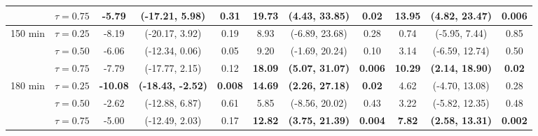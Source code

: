 \begin{table}[ht]
{\begin{tabular}{llccccccccc}
 & $\tau=0.75$ & -5.79 & (-17.21, 5.98) & 0.31 & \textbf{19.73} & \textbf{(4.43, 33.85)} & \textbf{0.02} & \textbf{13.95} & \textbf{(4.82, 23.47)} & \textbf{0.006} \\
\midrule
\multirow{3}{*}{150 min} & $\tau=0.25$ & -8.19 & (-20.17, 3.92) & 0.19 & 8.93 & (-6.89, 23.68) & 0.28 & 0.74 & (-5.95, 7.44) & 0.85 \\
 & $\tau=0.50$ & -6.06 & (-12.34, 0.06) & 0.05 & 9.20 & (-1.69, 20.24) & 0.10 & 3.14 & (-6.59, 12.74) & 0.50 \\
 & $\tau=0.75$ & -7.79 & (-17.77, 2.15) & 0.12 & \textbf{18.09} & \textbf{(5.07, 31.07)} & \textbf{0.006} & \textbf{10.29} & \textbf{(2.14, 18.90)} & \textbf{0.02} \\
\midrule
\multirow{3}{*}{180 min} & $\tau=0.25$ & \textbf{-10.08} & \textbf{(-18.43, -2.52)} & \textbf{0.008} & \textbf{14.69} & \textbf{(2.26, 27.18)} & \textbf{0.02} & 4.62 & (-4.70, 13.08) & 0.28 \\
 & $\tau=0.50$ & -2.62 & (-12.88, 6.87) & 0.61 & 5.85 & (-8.56, 20.02) & 0.43 & 3.22 & (-5.82, 12.35) & 0.48 \\
 & $\tau=0.75$ & -5.00 & (-12.49, 2.03) & 0.17 & \textbf{12.82} & \textbf{(3.75, 21.39)} & \textbf{0.004} & \textbf{7.82} & \textbf{(2.58, 13.31)} & \textbf{0.002} \\
\bottomrule
\end{tabular}%
}
\end{table}
